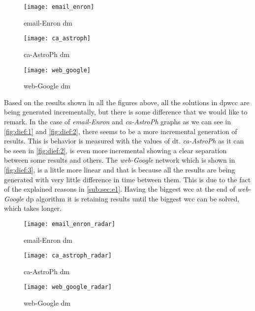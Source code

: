 \begin{figure}[!htb]
    \centering
    \begin{minipage}{0.33\textwidth}
     \texttt{[image: email\_enron]}
      \caption{email-Enron \acrshort{dm}}
      \label{fig:dief:1}
    \end{minipage}%
    \begin{minipage}{0.33\textwidth}
     \texttt{[image: ca\_astroph]}
      \caption{ca-AstroPh \acrshort{dm}}
      \label{fig:dief:2}
    \end{minipage}%
    \begin{minipage}{0.33\textwidth}
     \texttt{[image: web\_google]}
      \caption{web-Google \acrshort{dm}}
      \label{fig:dief:3}
    \end{minipage}
\end{figure}

Based on the results shown in all the figures above, all the solutions in \acrshort{dpwcc} are being generated incrementally, but there is some difference that we would like to remark. In the case of \emph{email-Enron} and \emph{ca-AstroPh} graphs as we can see in \autoref{fig:dief:1} and \autoref{fig:dief:2}, there seems to be a more incremental generation of results. This is behavior is measured with the values of \acrfull{dt}. \emph{ca-AstroPh} as it can be seen in \autoref{fig:dief:2}, is even more incremental showing a clear separation between some results and others. The \emph{web-Google} network which is shown in \autoref{fig:dief:3}, is a little more linear and that is because all the results are being generated with very little difference in time between them. This is due to the fact of the explained reasons in \autoref{sub:sec:e1}. Having the biggest \acrshort{wcc} at the end of \emph{web-Google} \acrshort{dp} algorithm it is retaining results until the biggest \acrshort{wcc} can be solved, which takes longer. 

\begin{figure}[!htb]
    \centering
    \begin{minipage}{0.33\textwidth}
     \texttt{[image: email\_enron\_radar]}
      \caption{email-Enron \acrshort{dm}}
      \label{fig:dief:rad:1}
    \end{minipage}%
    \begin{minipage}{0.33\textwidth}
     \texttt{[image: ca\_astroph\_radar]}
      \caption{ca-AstroPh \acrshort{dm}}
      \label{fig:dief:rad:2}
    \end{minipage}%
    \begin{minipage}{0.33\textwidth}
     \texttt{[image: web\_google\_radar]}
      \caption{web-Google \acrshort{dm}}
      \label{fig:dief:rad:3}
    \end{minipage}
\end{figure}

